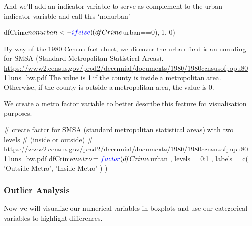 \documentclass[]{article}
\newenvironment{Shaded}{}{}
\newcommand{\CommentTok}[1]{\textcolor[rgb]{0.00,0.50,0.00}{#1}}
\newcommand{\DataTypeTok}[1]{#1}
\newcommand{\DecValTok}[1]{#1}
\newcommand{\KeywordTok}[1]{\textcolor[rgb]{0.00,0.00,1.00}{#1}}
\newcommand{\NormalTok}[1]{#1}
\newcommand{\OperatorTok}[1]{#1}
\newcommand{\StringTok}[1]{\textcolor[rgb]{0.00,0.50,0.50}{#1}}
\begin{document}
And we'll add an indicator variable to serve as complement to the urban
indicator variable and call this `nonurban'

\begin{Shaded}
\begin{Highlighting}[]
\NormalTok{dfCrime}\OperatorTok{$}\NormalTok{nonurban <-}\StringTok{ }\KeywordTok{ifelse}\NormalTok{((dfCrime}\OperatorTok{$}\NormalTok{urban}\OperatorTok{==}\DecValTok{0}\NormalTok{), }\DecValTok{1}\NormalTok{, }\DecValTok{0}\NormalTok{)}
\end{Highlighting}
\end{Shaded}

By way of the 1980 Census fact sheet, we discover the urban field is an
encoding for SMSA (Standard Metropolitan Statistical Areas).
\url{https://www2.census.gov/prod2/decennial/documents/1980/1980censusofpopu8011uns_bw.pdf}
The value is 1 if the county is inside a metropolitan area. Otherwise,
if the county is outside a metropolitan area, the value is 0.

We create a metro factor variable to better describe this feature for
visualization purposes.

\begin{Shaded}
\begin{Highlighting}[]
\CommentTok{# create factor for SMSA (standard metropolitan statistical areas) with two levels}
\CommentTok{# (inside or outside)}
\CommentTok{#    https://www2.census.gov/prod2/decennial/documents/1980/1980censusofpopu8011uns_bw.pdf}
\NormalTok{dfCrime}\OperatorTok{$}\NormalTok{metro =}
\StringTok{            }\KeywordTok{factor}\NormalTok{( dfCrime}\OperatorTok{$}\NormalTok{urban , }\DataTypeTok{levels =} \DecValTok{0}\OperatorTok{:}\DecValTok{1}\NormalTok{ , }\DataTypeTok{labels =}
                    \KeywordTok{c}\NormalTok{( }\StringTok{'Outside Metro'}\NormalTok{,}
                       \StringTok{'Inside Metro'}
\NormalTok{                      )}
\NormalTok{                   )}
\end{Highlighting}
\end{Shaded}

\hypertarget{outlier-analysis}{%
\subsubsection{Outlier Analysis}\label{outlier-analysis}}

Now we will visualize our numerical variables in boxplots and use our
categorical variables to highlight differences.
\end{document}
